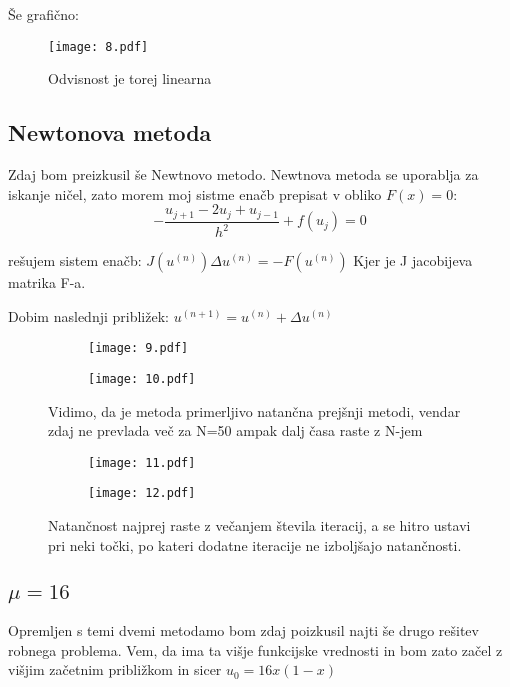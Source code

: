 \documentclass{article}
\begin{document}
Še grafično:

\begin{figure}[H]
\texttt{[image: 8.pdf]}
\caption*{Odvisnost je torej linearna}
\end{figure}

\newpage
\subsection{Newtonova metoda}
Zdaj bom preizkusil še Newtnovo metodo.
Newtnova metoda se uporablja za iskanje ničel, zato morem moj sistme enačb prepisat v obliko $F(x) = 0$:
\begin{equation*}
-\frac{u_{j+1} - 2u_j + u_{j-1}}{h^2} + f(u_j) = 0
\end{equation*}

rešujem sistem enačb:
$J(u^{(n)}) \Delta u^{(n)} = -F(u^{(n)})$
Kjer je J jacobijeva matrika F-a.

Dobim naslednji približek:
$u^{(n+1)} = u^{(n)} + \Delta u^{(n)}$


\begin{figure}[H]
\begin{subfigure}{.5\textwidth}
\texttt{[image: 9.pdf]}
\end{subfigure}
\begin{subfigure}{.5\textwidth}
\texttt{[image: 10.pdf]}
\end{subfigure}
\caption*{Vidimo, da je metoda primerljivo natančna prejšnji metodi, vendar zdaj ne prevlada več za N=50 ampak dalj časa raste z N-jem}
\end{figure}

\begin{figure}[H]
\begin{subfigure}{.5\textwidth}
\texttt{[image: 11.pdf]}
\end{subfigure}
\begin{subfigure}{.5\textwidth}
\texttt{[image: 12.pdf]}
\end{subfigure}
\caption*{Natančnost najprej raste z večanjem števila iteracij, a se hitro ustavi pri neki točki, po kateri dodatne iteracije ne izboljšajo natančnosti.}
\end{figure}

\newpage
\subsection{$\mu=16$}

Opremljen s temi dvemi metodamo bom zdaj poizkusil najti še drugo rešitev robnega problema. Vem, da ima ta višje funkcijske vrednosti in bom zato začel z višjim začetnim približkom 
in sicer $u_0 = 16x(1-x)$
\end{document}
